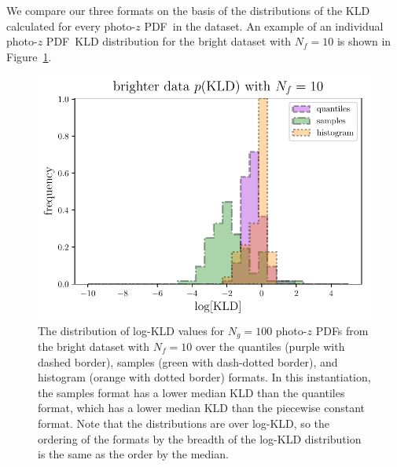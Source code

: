 \documentclass[\docopts]{\docclass}
\newcommand{\pz}{photo-$z$ PDF}
\newcommand{\mgdata}{bright\xspace}
\begin{document}
We compare our three formats on the basis of the distributions of the KLD 
calculated for every \pz\ in the dataset.
An example of an individual \pz\ KLD distribution for the \mgdata dataset with 
$N_{f}=10$ is shown in Figure~\ref{fig:individual}.
\begin{figure}
  \begin{center}
    \includegraphics[width=\columnwidth]{figures/individual_kld.pdf}
    \caption{The distribution of log-KLD values for $N_{g}=100$ \pz s from the 
\mgdata dataset with $N_{f}=10$ over the quantiles (purple with dashed border), 
samples (green with dash-dotted border), and histogram (orange with dotted 
border) formats.
    In this instantiation, the samples format has a lower median KLD than the 
quantiles format, which has a lower median KLD than the piecewise constant 
format.
    Note that the distributions are over log-KLD, so the ordering of the 
formats by the breadth of the log-KLD distribution is the same as the order by 
the median.
    \label{fig:individual}}
  \end{center}
\end{figure}
\end{document}

